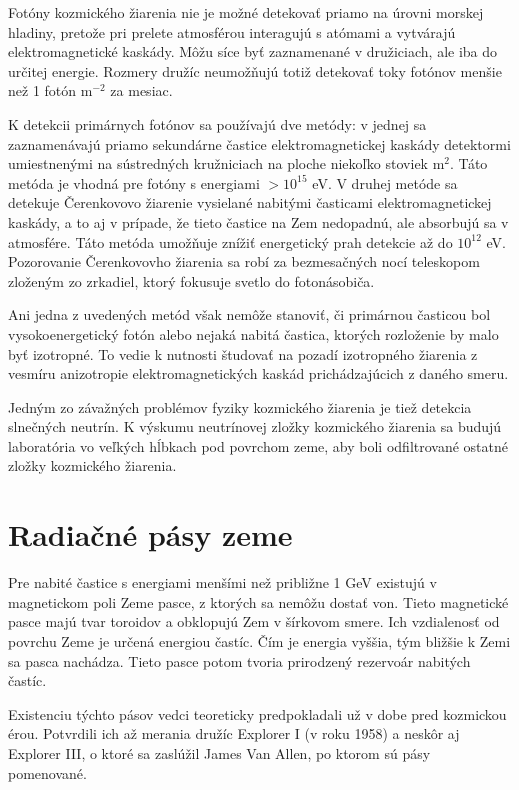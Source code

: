 \documentclass[../../main.tex]{subfiles}
\begin{document}
Fotóny kozmického žiarenia nie je možné detekovať priamo na úrovni morskej hladiny, pretože pri prelete atmosférou interagujú s atómami a vytvárajú elektromagnetické kaskády. Môžu síce byť zaznamenané v družiciach, ale iba do určitej energie. Rozmery družíc neumožňujú totiž detekovať toky fotónov menšie než 1 fotón m$^{-2}$ za mesiac.

K detekcii primárnych fotónov sa používajú dve metódy: v jednej sa zaznamenávajú priamo sekundárne častice elektromagnetickej kaskády detektormi umiestnenými na sústredných kružniciach na ploche niekoľko stoviek m$^2$. Táto metóda je vhodná pre fotóny s energiami $>10^{15}$ eV. V druhej metóde sa detekuje Čerenkovovo žiarenie vysielané nabitými časticami elektromagnetickej kaskády, a to aj v prípade, že tieto častice na Zem nedopadnú, ale absorbujú sa v atmosfére. Táto metóda umožňuje znížiť energetický prah detekcie až do $10^{12}$ eV. Pozorovanie Čerenkovovho žiarenia sa robí za bezmesačných nocí teleskopom zloženým zo zrkadiel, ktorý fokusuje svetlo do fotonásobiča.

Ani jedna z uvedených metód však nemôže stanoviť, či primárnou časticou bol vysokoenergetický fotón alebo nejaká nabitá častica, ktorých rozloženie by malo byť izotropné. To vedie k nutnosti študovať na pozadí izotropného žiarenia z vesmíru anizotropie elektromagnetických kaskád prichádzajúcich z daného smeru.

Jedným zo závažných problémov fyziky kozmického žiarenia je tiež detekcia slnečných neutrín. K výskumu neutrínovej zložky kozmického žiarenia sa budujú laboratória vo veľkých hĺbkach pod povrchom zeme, aby boli odfiltrované ostatné zložky kozmického žiarenia.


\section{Radiačné pásy zeme}

Pre nabité častice s energiami menšími než približne 1 GeV existujú v magnetickom poli Zeme pasce, z ktorých sa nemôžu dostať von. Tieto magnetické pasce majú tvar toroidov a obklopujú Zem v šírkovom smere. Ich vzdialenosť od povrchu Zeme je určená energiou častíc. Čím je energia vyššia, tým bližšie k Zemi sa pasca nachádza. Tieto pasce potom tvoria prirodzený rezervoár nabitých častíc.

Existenciu týchto pásov vedci teoreticky predpokladali už v dobe pred kozmickou érou. Potvrdili ich až merania družíc Explorer I (v roku 1958) a neskôr aj Explorer III, o ktoré sa zaslúžil James Van Allen, po ktorom sú pásy pomenované.
\end{document}
